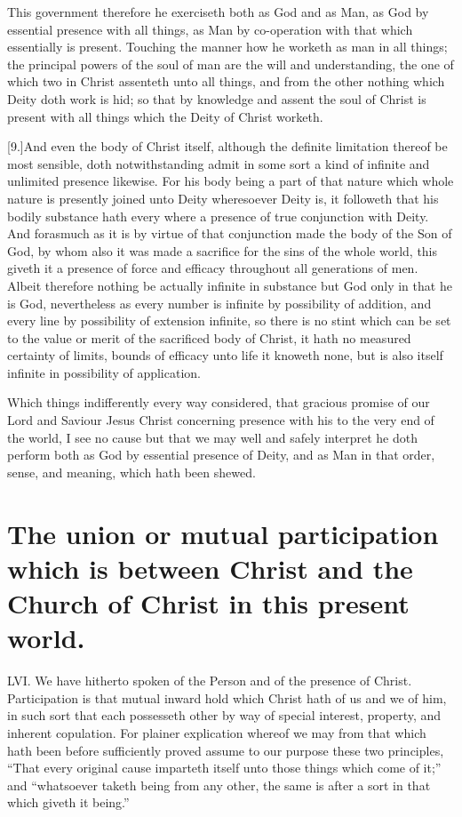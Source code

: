  This government therefore he exerciseth both as God and as Man, as God by essential presence with all things, as Man by co-operation with that which essentially is present. Touching the manner how he worketh as man in all things; the principal powers of the soul of man are the will and understanding, the one of which two in Christ assenteth unto all things, and from the other nothing which Deity doth work is hid; so that by knowledge and assent the soul of Christ is present with all things which the Deity of Christ worketh.

[9.]And even the body of Christ itself, although the definite limitation thereof be most sensible, doth notwithstanding admit in some sort a kind of infinite and unlimited presence likewise. For his body being a part of that nature which whole nature is presently joined unto Deity wheresoever Deity is, it followeth that his bodily substance hath every where a presence of true conjunction with Deity. And forasmuch as it is by virtue of that conjunction made the body of the Son of God, by whom also it was made a sacrifice for the sins of the whole world, this giveth it a presence of force and efficacy throughout all generations of men. Albeit therefore nothing be actually infinite in substance but God only in that he is God, nevertheless as every number is infinite by possibility of addition, and every line by possibility of extension infinite, so there is no stint which can be set to the value or merit of the sacrificed body of Christ, it hath no measured certainty of limits, bounds of efficacy unto life it knoweth none, but is also itself infinite in possibility of application.

Which things indifferently every way considered, that gracious promise of our Lord and Saviour Jesus Christ concerning presence with his to the very end of the world, I see no cause but that we may well and safely interpret he doth perform both as God by essential presence of Deity, and as Man in that order, sense, and meaning, which hath been shewed.


\section*{The union or mutual participation which is between Christ and the Church of Christ in this present world.}
LVI. We have hitherto spoken of the Person and of the presence of Christ. Participation is that mutual inward hold which Christ hath of us and we of him, in such sort that each possesseth other by way of special interest, property, and inherent copulation. For plainer explication whereof we may from that which hath been before sufficiently proved assume  to our purpose these two principles, “That every original cause imparteth itself unto those things which come of it;” and “whatsoever taketh being from any other, the same is after a sort in that which giveth it being.”


